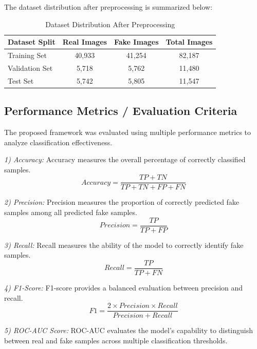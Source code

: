 \documentclass[conference]{IEEEtran}
\begin{document}
The dataset distribution after preprocessing is summarized below:

\begin{table}[htbp]
\caption{Dataset Distribution After Preprocessing}
\begin{center}
\begin{tabular}{|l|c|c|c|}
\hline
\textbf{Dataset Split} & \textbf{Real Images} & \textbf{Fake Images} & \textbf{Total Images} \\
\hline
Training Set   & 40,933 & 41,254 & 82,187 \\
Validation Set & 5,718  & 5,762  & 11,480 \\
Test Set       & 5,742  & 5,805  & 11,547 \\
\hline
\end{tabular}
\label{tab1}
\end{center}
\end{table}

\subsection{Performance Metrics / Evaluation Criteria}

The proposed framework was evaluated using multiple performance metrics to analyze
classification effectiveness.

\textit{1) Accuracy:} Accuracy measures the overall percentage of correctly
classified samples.
\begin{equation}
Accuracy = \frac{TP + TN}{TP + TN + FP + FN}
\end{equation}

\textit{2) Precision:} Precision measures the proportion of correctly predicted
fake samples among all predicted fake samples.
\begin{equation}
Precision = \frac{TP}{TP + FP}
\end{equation}

\textit{3) Recall:} Recall measures the ability of the model to correctly identify
fake samples.
\begin{equation}
Recall = \frac{TP}{TP + FN}
\end{equation}

\textit{4) F1-Score:} F1-score provides a balanced evaluation between precision
and recall.
\begin{equation}
F1 = \frac{2 \times Precision \times Recall}{Precision + Recall}
\end{equation}

\textit{5) ROC-AUC Score:} ROC-AUC evaluates the model's capability to distinguish
between real and fake samples across multiple classification thresholds.
\end{document}
